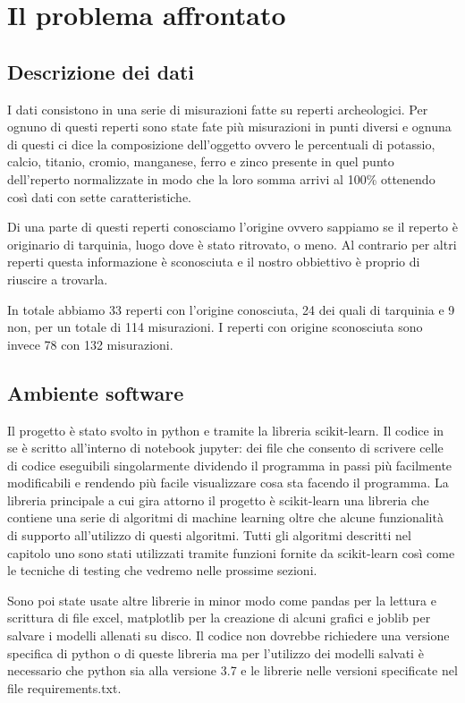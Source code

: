\documentclass[a4paper,12pt]{report}
\begin{document}
\chapter{Il problema affrontato}
\label{cap2}
\section{Descrizione dei dati}
I dati consistono in una serie di misurazioni fatte su reperti archeologici. Per
ognuno di questi reperti sono state fate più misurazioni in punti diversi e
ognuna di questi ci dice la composizione dell'oggetto ovvero le percentuali di
potassio, calcio, titanio, cromio, manganese, ferro e zinco presente in quel
punto dell'reperto normalizzate in modo che la loro somma arrivi al 100\%
ottenendo così dati con sette caratteristiche. 

Di una parte di questi reperti conosciamo l'origine ovvero sappiamo se il
reperto è originario di tarquinia, luogo dove è stato ritrovato, o meno. Al
contrario per altri reperti questa informazione è sconosciuta e il nostro
obbiettivo è proprio di riuscire a trovarla.

In totale abbiamo 33 reperti con l'origine conosciuta, 24 dei quali di tarquinia
e 9 non, per un totale di 114 misurazioni. I reperti con origine sconosciuta
sono invece 78 con 132 misurazioni.

\section{Ambiente software}
Il progetto è stato svolto in python e tramite la libreria scikit-learn. Il
codice in se è scritto all'interno di notebook jupyter: dei file che consento di
scrivere celle di codice eseguibili singolarmente dividendo il programma in
passi più facilmente modificabili e rendendo più facile visualizzare cosa sta
facendo il programma. La libreria principale a cui gira attorno il progetto è
scikit-learn una libreria che contiene una serie di algoritmi di machine
learning oltre che alcune funzionalità di supporto all'utilizzo di questi
algoritmi. Tutti gli algoritmi descritti nel capitolo uno sono stati utilizzati
tramite funzioni fornite da scikit-learn così come le tecniche di testing che
vedremo nelle prossime sezioni. 

Sono poi state usate altre librerie in minor modo come pandas per la lettura e
scrittura di file excel, matplotlib per la creazione di alcuni grafici e joblib
per salvare i modelli allenati su disco. Il codice non dovrebbe richiedere una
versione specifica di python o di queste libreria ma per l'utilizzo dei modelli
salvati è necessario che python sia alla versione 3.7 e le librerie nelle
versioni specificate nel file requirements.txt.
\end{document}
